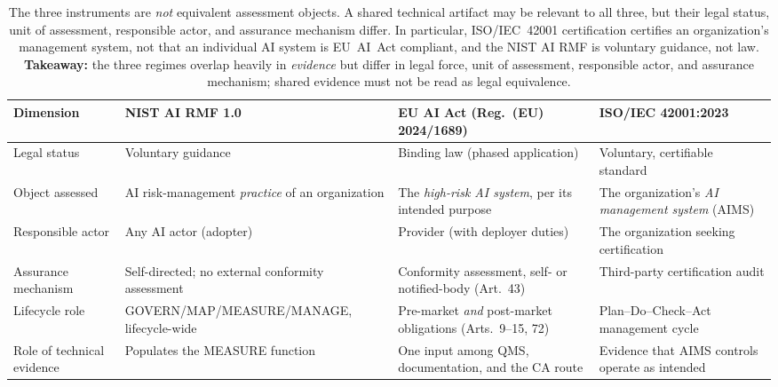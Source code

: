 \begin{table}[t]
\centering
\caption{The three instruments are \emph{not} equivalent assessment objects. A shared
technical artifact may be relevant to all three, but their legal status, unit of assessment,
responsible actor, and assurance mechanism differ. In particular, ISO/IEC~42001 certification
certifies an organization's management system, not that an individual AI system is EU~AI~Act
compliant, and the NIST AI RMF is voluntary guidance, not law. \textbf{Takeaway:} the three
regimes overlap heavily in \emph{evidence} but differ in legal force, unit of assessment,
responsible actor, and assurance mechanism; shared evidence must not be read as legal
equivalence.}
\label{tab:frameworks}
\footnotesize
\setlength{\tabcolsep}{4pt}
\begin{tabular}{p{}p{}p{}p{}}
\toprule
Dimension & NIST AI RMF 1.0 & EU AI Act (Reg.\ (EU) 2024/1689) & ISO/IEC 42001:2023\\
\midrule
Legal status & Voluntary guidance & Binding law (phased application) & Voluntary, certifiable standard\\
Object assessed & AI risk-management \emph{practice} of an organization & The \emph{high-risk AI system}, per its intended purpose & The organization's \emph{AI management system} (AIMS)\\
Responsible actor & Any AI actor (adopter) & Provider (with deployer duties) & The organization seeking certification\\
Assurance mechanism & Self-directed; no external conformity assessment & Conformity assessment, self- or notified-body (Art.~43) & Third-party certification audit\\
Lifecycle role & GOVERN/MAP/MEASURE/MANAGE, lifecycle-wide & Pre-market \emph{and} post-market obligations (Arts.~9--15, 72) & Plan--Do--Check--Act management cycle\\
Role of technical evidence & Populates the MEASURE function & One input among QMS, documentation, and the CA route & Evidence that AIMS controls operate as intended\\
\bottomrule
\end{tabular}
\end{table}
